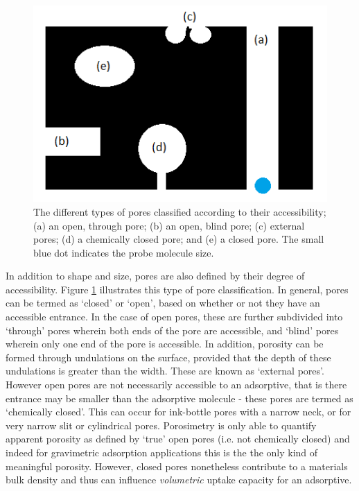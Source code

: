 \begin{figure}[b!]
    \centering
    \includegraphics[width=\columnwidth, keepaspectratio]{1-introduction/figs/pore_accessibility.png}
    \caption{The different types of pores classified according to their accessibility; (a) an open, through pore; (b) an open, blind pore; (c) external pores; (d) a chemically closed pore; and (e) a closed pore. The small blue dot indicates the probe molecule size.}
    \label{fig:pore_accessibility}
\end{figure}

In addition to shape and size, pores are also defined by their degree of accessibility. Figure \ref{fig:pore_accessibility} illustrates this type of pore classification. In general, pores can be termed as `closed' or `open', based on whether or not they have an accessible entrance. In the case of open pores, these are further subdivided into `through' pores wherein both ends of the pore are accessible, and `blind' pores wherein only one end of the pore is accessible. In addition, porosity can be formed through undulations on the surface, provided that the depth of these undulations is greater than the width. These are known as `external pores'. However open pores are not necessarily accessible to an adsorptive, that is there entrance may be smaller than the adsorptive molecule - these pores are termed as `chemically closed'. This can occur for ink-bottle pores with a narrow neck, or for very narrow slit or cylindrical pores.\citep{rouquerol1994recommendations, kaneko1994determination, zdravkov2007pore} Porosimetry is only able to quantify apparent porosity as defined by `true' open pores (i.e. not chemically closed) and indeed for gravimetric adsorption applications this is the the only kind of meaningful porosity. However, closed pores nonetheless contribute to a materials bulk density and thus can influence \textit{volumetric} uptake capacity for an adsorptive.


